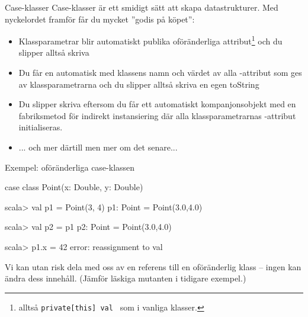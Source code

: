 \begin{Slide}{Case-klasser}
Case-klasser är ett smidigt sätt att skapa  datastrukturer. Med nyckelordet  framför  får du mycket ''godis på köpet'':

\begin{itemize}
\item Klassparametrar blir automatiskt publika oföränderliga attribut\footnote{alltså  \texttt{private[this] val } som i vanliga klasser.} och du slipper alltså skriva 
\item Du får en automatisk  med klassens namn och värdet av alla -attribut som ges av klassparametrarna och du slipper alltså skriva en egen toString
\item Du slipper skriva  eftersom du får ett automatiskt kompanjonsobjekt med en fabriksmetod  för indirekt instansiering där alla klassparametrarnas -attribut initialiseras.
\pause
\item ... och mer därtill men mer om det senare...
\end{itemize}
\end{Slide}




\begin{Slide}{Exempel: oföränderliga case-klassen }

\begin{Code}[basicstyle=\SlideFontSize{10}{12}\ttfamily]
case class Point(x: Double, y: Double)
\end{Code}

\begin{REPLnonum}
scala> val p1 = Point(3, 4)
p1: Point = Point(3.0,4.0)

scala> val p2 = p1
p2: Point = Point(3.0,4.0)

scala> p1.x = 42
error: reassignment to val
\end{REPLnonum}
Vi kan utan risk dela med oss av en referens till en oföränderlig klass -- ingen kan ändra dess innehåll. (Jämför läskiga mutanten i tidigare exempel.)

\end{Slide}









